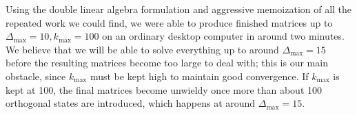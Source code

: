 \begin{subappendices}
Using the double linear algebra formulation and aggressive memoization of all
the repeated work we could find, we were able to produce finished matrices up to
$\Delta_\mathrm{max} = 10, k_\mathrm{max} = 100$ on an ordinary desktop computer 
in around two minutes. We believe that we will be able to solve everything up to 
around $\Delta_\mathrm{max} = 15$ before the resulting matrices become too large 
to deal with; this is our main obstacle, since $k_\mathrm{max}$ must be kept
high to maintain good convergence. If $k_\mathrm{max}$ is kept at 100, the final
matrices become unwieldy once more than about 100 orthogonal states are 
introduced, which happens at around $\Delta_\mathrm{max} = 15$.



\end{subappendices}
